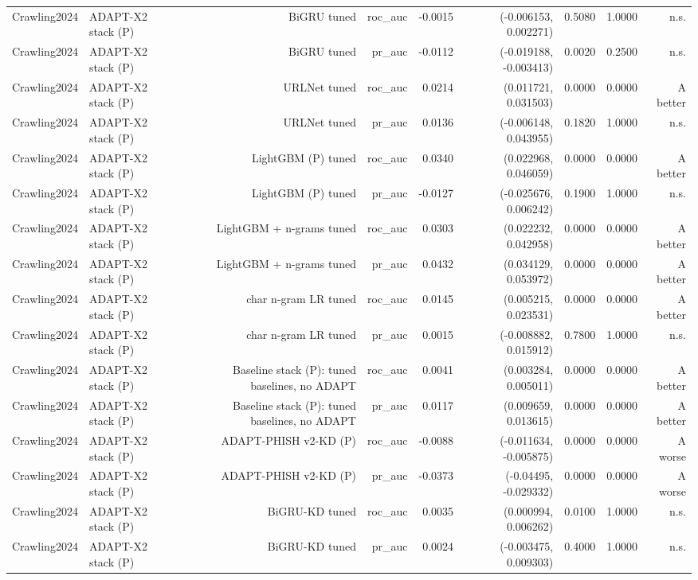 \begin{table}[t]
\begin{tabular}{llrrrrrrr}
Crawling2024 & ADAPT-X2 stack (P) & BiGRU tuned & roc\_auc & -0.0015 & (-0.006153, 0.002271) & 0.5080 & 1.0000 & n.s. \\
Crawling2024 & ADAPT-X2 stack (P) & BiGRU tuned & pr\_auc & -0.0112 & (-0.019188, -0.003413) & 0.0020 & 0.2500 & n.s. \\
Crawling2024 & ADAPT-X2 stack (P) & URLNet tuned & roc\_auc & 0.0214 & (0.011721, 0.031503) & 0.0000 & 0.0000 & A better \\
Crawling2024 & ADAPT-X2 stack (P) & URLNet tuned & pr\_auc & 0.0136 & (-0.006148, 0.043955) & 0.1820 & 1.0000 & n.s. \\
Crawling2024 & ADAPT-X2 stack (P) & LightGBM (P) tuned & roc\_auc & 0.0340 & (0.022968, 0.046059) & 0.0000 & 0.0000 & A better \\
Crawling2024 & ADAPT-X2 stack (P) & LightGBM (P) tuned & pr\_auc & -0.0127 & (-0.025676, 0.006242) & 0.1900 & 1.0000 & n.s. \\
Crawling2024 & ADAPT-X2 stack (P) & LightGBM + n-grams tuned & roc\_auc & 0.0303 & (0.022232, 0.042958) & 0.0000 & 0.0000 & A better \\
Crawling2024 & ADAPT-X2 stack (P) & LightGBM + n-grams tuned & pr\_auc & 0.0432 & (0.034129, 0.053972) & 0.0000 & 0.0000 & A better \\
Crawling2024 & ADAPT-X2 stack (P) & char n-gram LR tuned & roc\_auc & 0.0145 & (0.005215, 0.023531) & 0.0000 & 0.0000 & A better \\
Crawling2024 & ADAPT-X2 stack (P) & char n-gram LR tuned & pr\_auc & 0.0015 & (-0.008882, 0.015912) & 0.7800 & 1.0000 & n.s. \\
Crawling2024 & ADAPT-X2 stack (P) & Baseline stack (P): tuned baselines, no ADAPT & roc\_auc & 0.0041 & (0.003284, 0.005011) & 0.0000 & 0.0000 & A better \\
Crawling2024 & ADAPT-X2 stack (P) & Baseline stack (P): tuned baselines, no ADAPT & pr\_auc & 0.0117 & (0.009659, 0.013615) & 0.0000 & 0.0000 & A better \\
Crawling2024 & ADAPT-X2 stack (P) & ADAPT-PHISH v2-KD (P) & roc\_auc & -0.0088 & (-0.011634, -0.005875) & 0.0000 & 0.0000 & A worse \\
Crawling2024 & ADAPT-X2 stack (P) & ADAPT-PHISH v2-KD (P) & pr\_auc & -0.0373 & (-0.04495, -0.029332) & 0.0000 & 0.0000 & A worse \\
Crawling2024 & ADAPT-X2 stack (P) & BiGRU-KD tuned & roc\_auc & 0.0035 & (0.000994, 0.006262) & 0.0100 & 1.0000 & n.s. \\
Crawling2024 & ADAPT-X2 stack (P) & BiGRU-KD tuned & pr\_auc & 0.0024 & (-0.003475, 0.009303) & 0.4000 & 1.0000 & n.s. \\

\end{tabular}
\end{table}
